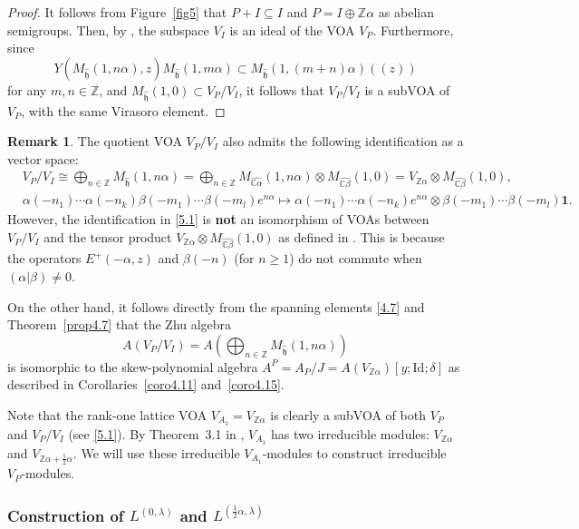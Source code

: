 \documentclass[12pt,a4paper,reqno]{amsart}
\numberwithin{equation}{section}
\numberwithin{equation}{section}
\theoremstyle{definition}
\newtheorem{remark}[thm]{Remark}
\newcommand{\Z}{\mathbb{Z}}
\def \C {\mathbb{C}}
\def\la{\lambda}
\def \al{\alpha}
\def \b {\beta}
\def \op {\oplus}
\def \vac {\mathbf{1}}
\def \h {\mathfrak{h}}
\def\Id{\mathrm{Id}}
\begin{document}
	\begin{proof}
		It follows from Figure~\ref{fig5} that $P+I\subseteq I$ and $P=I\op \Z \al$ as abelian semigroups. Then, by \cite[Proposition~3.2]{Liu24}, the subspace $V_I$ is an ideal of the VOA $V_P$. Furthermore, since 
		\[
		Y(M_{\hat{\h}}(1,n\al),z)M_{\hat{\h}}(1,m\al)\subset M_{\hat{\h}}(1,(m+n)\al)((z))
		\]
		for any $m,n\in \Z$, and $M_{\hat{\h}}(1,0)\subset V_P/V_I$, it follows that $V_P/V_I$ is a subVOA of $V_P$, with the same Virasoro element. 
	\end{proof}
	
	\begin{remark}\label{rem5.2}
		The quotient VOA $V_P/V_I$ also admits the following identification as a vector space:
		\begin{equation}\label{5.1}
			\begin{aligned}
				&V_P/V_I\cong \bigoplus_{n\in \Z} M_{\hat{\h}}(1,n\al)
				=\bigoplus_{n\in \Z} M_{\widehat{\C\al}}(1,n\al)\otimes  M_{\widehat{\C\b}}(1,0)
				=V_{\Z\al}\otimes M_{\widehat{\C\b}}(1, 0),\\
				&\al(-n_1)\cdots \al(-n_k)\b(-m_1)\cdots \b(-m_l)e^{n\al}
				\longmapsto \al(-n_1)\cdots \al(-n_k)e^{n\al}\otimes \b(-m_1)\cdots \b(-m_l)\vac.
			\end{aligned} 
		\end{equation}
		However, the identification in \eqref{5.1} is {\bf not} an isomorphism of VOAs between $V_P/V_I$ and the tensor product $V_{\Z\al}\otimes M_{\widehat{\C \b}}(1,0)$ as defined in \cite{FHL}. This is because the operators $E^{+}(-\al,z)$ and $\b(-n)$ (for $n\geq 1$) do not commute when $(\al|\b)\neq 0$. 
		
		On the other hand, it follows directly from the spanning elements \eqref{4.7} and Theorem~\ref{prop4.7} that the Zhu algebra 
		\[
		A(V_P/V_I)=A\!\left(\bigoplus_{n\in \Z} M_{\hat{\h}}(1,n\al)\right)
		\]
		is isomorphic to the skew-polynomial algebra $A^P=A_P/J=A(V_{\Z\al})[y;\Id;\delta]$ as described in Corollaries~\ref{coro4.11} and~\ref{coro4.15}.
	\end{remark}
	
	Note that the rank-one lattice VOA $V_{A_1}=V_{\Z\al}$ is clearly a subVOA of both $V_P$ and $V_P/V_I$ (see \eqref{5.1}). By Theorem~3.1 in \cite{D}, $V_{A_1}$ has two irreducible modules: $V_{\Z\al}$ and $V_{\Z\al+\frac{1}{2}\al}$. We will use these irreducible $V_{A_1}$-modules to construct irreducible $V_P$-modules. 
	
	\subsubsection{Construction of $L^{(0,\la)}$ and $L^{(\frac{1}{2}\al,\la)}$}
	
\end{document}
